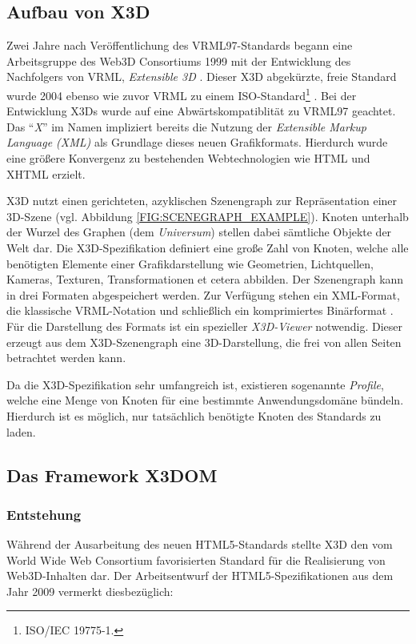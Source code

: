 \subsection{Aufbau von X3D}

Zwei Jahre nach Veröffentlichung des VRML97-Standards begann eine Arbeitsgruppe des Web3D Consortiums 1999 mit der Entwicklung des Nachfolgers von VRML, \emph{Extensible 3D} \autocite{Daly:2007}. Dieser X3D abgekürzte, freie Standard wurde 2004 ebenso wie zuvor VRML zu einem ISO-Standard\footnote{ISO/IEC 19775-1.} \autocite{Brutzman:2007:XEG:1214715}. Bei der Entwicklung X3Ds wurde auf eine Abwärtskompatiblität zu VRML97 geachtet. Das \enquote{\emph{X}} im Namen impliziert bereits die Nutzung der \emph{Extensible Markup Language (XML)} als Grundlage dieses neuen Grafikformats. Hierdurch wurde eine größere Konvergenz zu bestehenden Webtechnologien wie HTML und XHTML erzielt.

X3D nutzt einen gerichteten, azyklischen Szenengraph zur Repräsentation einer 3D-Szene (vgl. Abbildung \ref{FIG:SCENEGRAPH_EXAMPLE}). Knoten unterhalb der Wurzel des Graphen (dem \emph{Universum}) stellen dabei sämtliche Objekte der Welt dar. Die X3D-Spezifikation definiert eine große Zahl von Knoten, welche alle benötigten Elemente einer Grafikdarstellung wie Geometrien, Lichtquellen, Kameras, Texturen, Transformationen et cetera abbilden. Der Szenengraph kann in drei Formaten abgespeichert werden. Zur Verfügung stehen ein XML-Format, die klassische VRML-Notation und schließlich ein komprimiertes Binärformat \autocite{Daly:2007}. Für die Darstellung des Formats ist ein spezieller \emph{X3D-Viewer} notwendig. Dieser erzeugt aus dem X3D-Szenengraph eine 3D-Darstellung, die frei von allen Seiten betrachtet werden kann.

Da die X3D-Spezifikation sehr umfangreich ist, existieren sogenannte \emph{Profile}, welche eine Menge von Knoten für eine bestimmte Anwendungsdomäne bündeln. Hierdurch ist es möglich, nur tatsächlich benötigte Knoten des Standards zu laden.

\subsection{Das Framework X3DOM}

\subsubsection{Entstehung}

Während der Ausarbeitung des neuen HTML5-Standards stellte X3D den vom World Wide Web Consortium favorisierten Standard für die Realisierung von Web3D-Inhalten dar. Der Arbeitsentwurf der HTML5-Spezifikationen aus dem Jahr 2009 vermerkt diesbezüglich:

